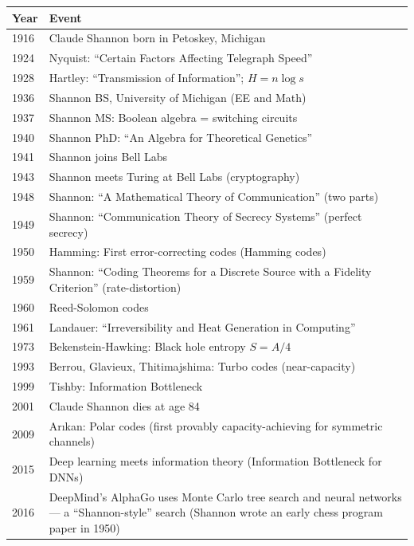 \begin{tabularx}{\linewidth}{|l|X|}
\hline
\textbf{Year} & \textbf{Event} \\ \hline
1916 & Claude Shannon born in Petoskey, Michigan \\ \hline
1924 & Nyquist: ``Certain Factors Affecting Telegraph Speed'' \\ \hline
1928 & Hartley: ``Transmission of Information''; $H = n \log s$ \\ \hline
1936 & Shannon BS, University of Michigan (EE and Math) \\ \hline
1937 & Shannon MS: Boolean algebra = switching circuits \\ \hline
1940 & Shannon PhD: ``An Algebra for Theoretical Genetics'' \\ \hline
1941 & Shannon joins Bell Labs \\ \hline
1943 & Shannon meets Turing at Bell Labs (cryptography) \\ \hline
1948 & Shannon: ``A Mathematical Theory of Communication'' (two parts) \\ \hline
1949 & Shannon: ``Communication Theory of Secrecy Systems'' (perfect secrecy) \\ \hline
1950 & Hamming: First error-correcting codes (Hamming codes) \\ \hline
1959 & Shannon: ``Coding Theorems for a Discrete Source with a Fidelity Criterion'' (rate-distortion) \\ \hline
1960 & Reed-Solomon codes \\ \hline
1961 & Landauer: ``Irreversibility and Heat Generation in Computing'' \\ \hline
1973 & Bekenstein-Hawking: Black hole entropy $S = A/4$ \\ \hline
1993 & Berrou, Glavieux, Thitimajshima: Turbo codes (near-capacity) \\ \hline
1999 & Tishby: Information Bottleneck \\ \hline
2001 & Claude Shannon dies at age 84 \\ \hline
2009 & Arıkan: Polar codes (first provably capacity-achieving for symmetric channels) \\ \hline
2015 & Deep learning meets information theory (Information Bottleneck for DNNs) \\ \hline
2016 & DeepMind's AlphaGo uses Monte Carlo tree search and neural networks — a ``Shannon-style'' search (Shannon wrote an early chess program paper in 1950) \\ \hline
\end{tabularx}

